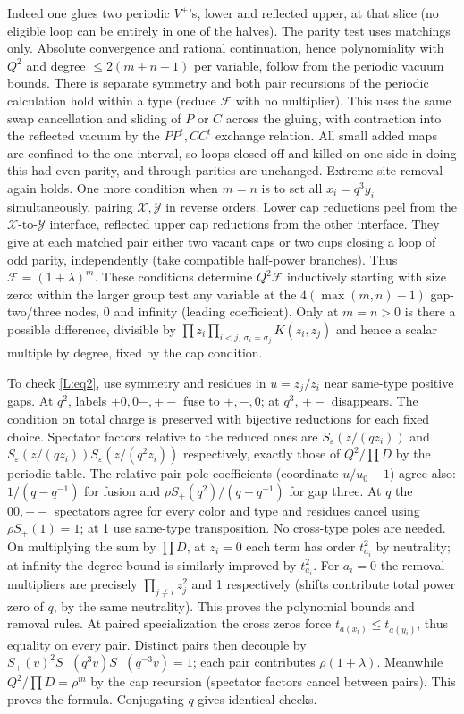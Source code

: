Indeed one glues two periodic \(V^+\)'s, lower and reflected upper, at that slice (no eligible loop can be entirely in one of the halves). The parity test uses matchings only. Absolute convergence and rational continuation, hence polynomiality with \(Q^2\) and degree \(\le2(m+n-1)\) per variable, follow from the periodic vacuum bounds. There is separate symmetry and both pair recursions of the periodic calculation hold within a type (reduce \(\mathcal F\) with no multiplier). This uses the same swap cancellation and sliding of \(P\) or \(C\) across the gluing, with contraction into the reflected vacuum by the \(P P^t,C C^t\) exchange relation. All small added maps are confined to the one interval, so loops closed off and killed on one side in doing this had even parity, and through parities are unchanged. Extreme-site removal again holds. One more condition when \(m=n\) is to set all \(x_i=q^3 y_i\) simultaneously, pairing \(\mathcal X,\mathcal Y\) in reverse orders. Lower cap reductions peel from the \(\mathcal X\)-to-\(\mathcal Y\) interface, reflected upper cap reductions from the other interface. They give at each matched pair either two vacant caps or two cups closing a loop of odd parity, independently (take compatible half-power branches). Thus \(\mathcal F=(1+\lambda)^m\). These conditions determine \(Q^2\mathcal F\) inductively starting with size zero: within the larger group test any variable at the \(4(\max(m,n)-1)\) gap-two/three nodes, 0 and infinity (leading coefficient). Only at \(m=n>0\) is there a possible difference, divisible by \(\prod z_i\prod_{i<j,\ \sigma_i=\sigma_j}K(z_i,z_j)\) and hence a scalar multiple by degree, fixed by the cap condition.

To check \eqref{L:eq2}, use symmetry and residues in \(u=z_j/z_i\) near same-type positive gaps. At \(q^2\), labels \(+0,0-,+-\) fuse to \(+, -,0\); at \(q^3\), \(+-\) disappears. The condition on total charge is preserved with bijective reductions for each fixed choice. Spectator factors relative to the reduced ones are \(S_\varepsilon(z/(qz_i))\) and \(S_\varepsilon(z/(qz_i))S_\varepsilon(z/(q^2z_i))\) respectively, exactly those of \(Q^2/\prod D\) by the periodic table. The relative pair pole coefficients (coordinate \(u/u_0-1\)) agree also: \(1/(q-q^{-1})\) for fusion and \(\rho S_+(q^2)/(q-q^{-1})\) for gap three. At \(q\) the \(00,+-\) spectators agree for every color and type and residues cancel using \(\rho S_+(1)=1\); at 1 use same-type transposition. No cross-type poles are needed. On multiplying the sum by \(\prod D\), at \(z_i=0\) each term has order \(t_{a_i}^2\) by neutrality; at infinity the degree bound is similarly improved by \(t_{a_i}^2\). For \(a_i=0\) the removal multipliers are precisely \(\prod_{j\ne i}z_j^2\) and 1 respectively (shifts contribute total power zero of \(q\), by the same neutrality). This proves the polynomial bounds and removal rules. At paired specialization the cross zeros force \(t_{a(x_i)}\le t_{a(y_i)}\), thus equality on every pair. Distinct pairs then decouple by \(S_+(v)^2 S_-(q^3v)S_-(q^{-3}v)=1\); each pair contributes \(\rho(1+\lambda)\). Meanwhile \(Q^2/\prod D=\rho^m\) by the cap recursion (spectator factors cancel between pairs). This proves the formula. Conjugating \(q\) gives identical checks.

